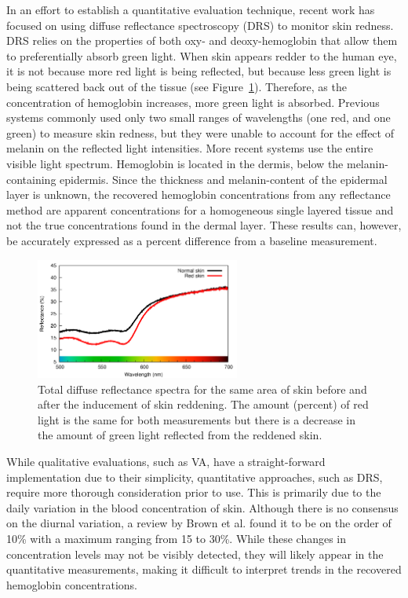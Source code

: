 In an effort to establish a quantitative evaluation technique, recent work has focused on using diffuse reflectance spectroscopy (DRS) to monitor skin redness. DRS relies on the properties of both oxy- and deoxy-hemoglobin that allow them to preferentially absorb green light. When skin appears redder to the human eye, it is not because more red light is being reflected, but because less green light is being scattered back out of the tissue (see Figure~\ref{fig:p4-drs_example}). Therefore, as the concentration of hemoglobin increases, more green light is absorbed. Previous systems commonly used only two small ranges of wavelengths (one red, and one green) to measure skin redness,\cite{Pearse1990,Dawson1980,Diffey1984,Feather1988} but they were unable to account for the effect of melanin on the reflected light intensities. More recent systems use the entire visible light spectrum.\cite{Stamatas2008,Yohan2014,Kollias2010} Hemoglobin is located in the dermis, below the melanin-containing epidermis. Since the thickness and melanin-content of the epidermal layer is unknown, the recovered hemoglobin concentrations from any reflectance method are apparent concentrations for a homogeneous single layered tissue and not the true concentrations found in the dermal layer. These results can, however, be accurately expressed as a percent difference from a baseline measurement.

\begin{figure}
	\centering \includegraphics[width=0.6\textwidth]{figures/p4-drs_example.png}
	\caption[Example of the diffuse reflectance spectra for normal and red skin]{\label{fig:p4-drs_example}Total diffuse reflectance spectra for the same area of skin before and after the inducement of skin reddening. The amount (percent) of red light is the same for both measurements but there is a decrease in the amount of green light reflected from the reddened skin.}
\end{figure}

While qualitative evaluations, such as VA, have a straight-forward implementation due to their simplicity, quantitative approaches, such as DRS, require more thorough consideration prior to use. This is primarily due to the daily variation in the blood concentration of skin. Although there is no consensus on the diurnal variation, a review by Brown et al. found it to be on the order of 10\% with a maximum ranging from 15 to 30\%.\cite{Brown1946} While these changes in concentration levels may not be visibly detected, they will likely appear in the quantitative measurements, making it difficult to interpret trends in the recovered hemoglobin concentrations.

